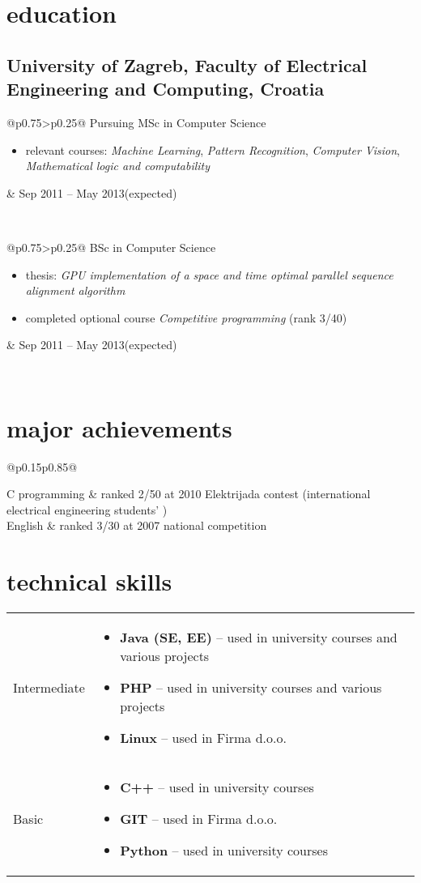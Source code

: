 \documentclass[a4paper]{article}
\makeatletter
\newlength{\tablewidth}
\newenvironment{period}[2]{%
\newcommand{\sarma}{#2}%
\setlength{\tablewidth}{\linewidth}
\addtolength{\tablewidth}{-2\tabcolsep}
\begin{tabular}{@{}p{0.75\tablewidth}>{\raggedleft\arraybackslash}p{0.25\tablewidth}@{}}%
#1 \newline
\begin{itemize}
}{%
\end{itemize} & \sarma \\%
\end{tabular}\\
}
\newenvironment{skills}{%
\setlength{\tablewidth}{\linewidth}
\addtolength{\tablewidth}{-2\tabcolsep}
\begin{tabular}{@{}p{0.15\tablewidth}p{0.85\tablewidth}@{}}
}{%
\end{tabular}
}
\makeatother
\begin{document}
\section{education}
\subsection{University of Zagreb, Faculty of Electrical Engineering and Computing, Croatia}
\begin{period}{Pursuing MSc in Computer Science}{Sep 2011 -- May 2013\linebreak(expected)}
    \item relevant courses:
        \textit{Machine Learning},
        \textit{Pattern Recognition},
        \textit{Computer Vision},
        \textit{Mathematical logic and computability}
\end{period}
\begin{period}{BSc in Computer Science}{Sep 2008 -- Jul 2011}
    \item thesis:
        \textit{GPU implementation of a space and time optimal parallel sequence alignment algorithm}
    \item completed optional course \textit{Competitive programming} (rank 3/40)
\end{period}

\section{major achievements}
\begin{skills}
    C programming   &   ranked 2/50 at 2010 Elektrijada contest (international electrical engineering students' 
                        ) \\
    English         &   ranked 3/30 at 2007 national competition
\end{skills}

\section{technical skills}
\begin{skills}
    Intermediate &
    \begin{itemize}
        \item \textbf{Java (SE, EE)} -- used in university courses and various projects
        \item \textbf{PHP} -- used in university courses and various projects
        \item \textbf{Linux} -- used in Firma d.o.o.
    \end{itemize} \\
    Basic &
    \begin{itemize}
        \item \textbf{C++} -- used in university courses
        \item \textbf{GIT} -- used in Firma d.o.o.
        \item \textbf{Python} -- used in university courses
    \end{itemize} \\
\end{skills}
\end{document}
